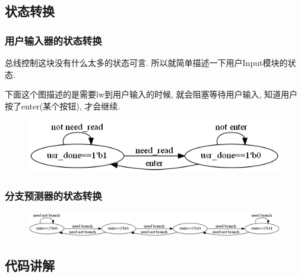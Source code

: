 \documentclass[UTF8]{article}
\begin{document}
\subsection{状态转换}
\subsubsection{用户输入器的状态转换}
总线控制这块没有什么太多的状态可言. 所以就简单描述一下用户Input模块的状态.\par
下面这个图描述的是需要lw到用户输入的时候, 就会阻塞等待用户输入, 知道用户按了enter(某个按钮), 才会继续.\par
\begin{figure}[H]
	\centering
	\includegraphics[width=\linewidth/3*2]{phase_diagram.png}
	\label{phase_diagram}
\end{figure}
\subsubsection{分支预测器的状态转换}
\begin{figure}[H]
	\centering
	\includegraphics[width=\linewidth]{predictor_phase_diagram.png}
	\label{predictor_phase_diagram}
\end{figure}
\subsection{代码讲解}
\end{document}
